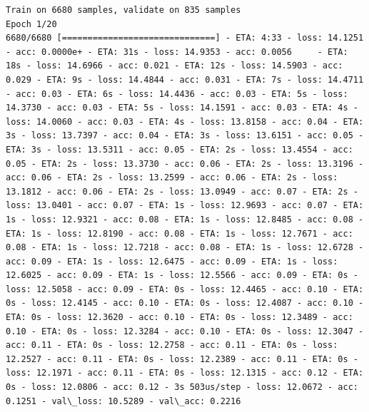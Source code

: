\documentclass[11pt]{article}
\begin{document}
    \begin{Verbatim}[commandchars=\\\{\}]
Train on 6680 samples, validate on 835 samples
Epoch 1/20
6680/6680 [==============================] - ETA: 4:33 - loss: 14.1251 - acc: 0.0000e+ - ETA: 31s - loss: 14.9353 - acc: 0.0056     - ETA: 18s - loss: 14.6966 - acc: 0.021 - ETA: 12s - loss: 14.5903 - acc: 0.029 - ETA: 9s - loss: 14.4844 - acc: 0.031 - ETA: 7s - loss: 14.4711 - acc: 0.03 - ETA: 6s - loss: 14.4436 - acc: 0.03 - ETA: 5s - loss: 14.3730 - acc: 0.03 - ETA: 5s - loss: 14.1591 - acc: 0.03 - ETA: 4s - loss: 14.0060 - acc: 0.03 - ETA: 4s - loss: 13.8158 - acc: 0.04 - ETA: 3s - loss: 13.7397 - acc: 0.04 - ETA: 3s - loss: 13.6151 - acc: 0.05 - ETA: 3s - loss: 13.5311 - acc: 0.05 - ETA: 2s - loss: 13.4554 - acc: 0.05 - ETA: 2s - loss: 13.3730 - acc: 0.06 - ETA: 2s - loss: 13.3196 - acc: 0.06 - ETA: 2s - loss: 13.2599 - acc: 0.06 - ETA: 2s - loss: 13.1812 - acc: 0.06 - ETA: 2s - loss: 13.0949 - acc: 0.07 - ETA: 2s - loss: 13.0401 - acc: 0.07 - ETA: 1s - loss: 12.9693 - acc: 0.07 - ETA: 1s - loss: 12.9321 - acc: 0.08 - ETA: 1s - loss: 12.8485 - acc: 0.08 - ETA: 1s - loss: 12.8190 - acc: 0.08 - ETA: 1s - loss: 12.7671 - acc: 0.08 - ETA: 1s - loss: 12.7218 - acc: 0.08 - ETA: 1s - loss: 12.6728 - acc: 0.09 - ETA: 1s - loss: 12.6475 - acc: 0.09 - ETA: 1s - loss: 12.6025 - acc: 0.09 - ETA: 1s - loss: 12.5566 - acc: 0.09 - ETA: 0s - loss: 12.5058 - acc: 0.09 - ETA: 0s - loss: 12.4465 - acc: 0.10 - ETA: 0s - loss: 12.4145 - acc: 0.10 - ETA: 0s - loss: 12.4087 - acc: 0.10 - ETA: 0s - loss: 12.3620 - acc: 0.10 - ETA: 0s - loss: 12.3489 - acc: 0.10 - ETA: 0s - loss: 12.3284 - acc: 0.10 - ETA: 0s - loss: 12.3047 - acc: 0.11 - ETA: 0s - loss: 12.2758 - acc: 0.11 - ETA: 0s - loss: 12.2527 - acc: 0.11 - ETA: 0s - loss: 12.2389 - acc: 0.11 - ETA: 0s - loss: 12.1971 - acc: 0.11 - ETA: 0s - loss: 12.1315 - acc: 0.12 - ETA: 0s - loss: 12.0806 - acc: 0.12 - 3s 503us/step - loss: 12.0672 - acc: 0.1251 - val\_loss: 10.5289 - val\_acc: 0.2216


\end{Verbatim}
\end{document}
